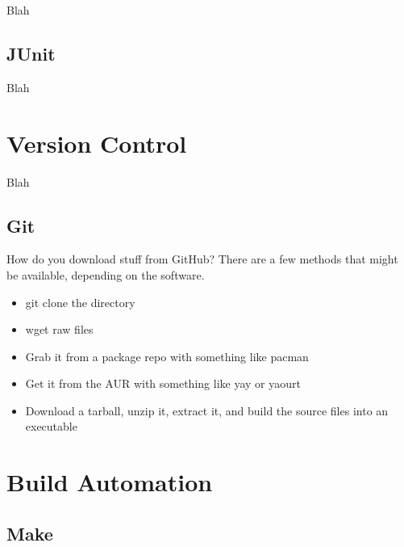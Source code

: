 Blah


\subsection{JUnit}

Blah


\toclineskip
\section{Version Control}

Blah


\subsection{Git}

How do you download stuff from GitHub? There are a few methods that might be available, depending on the software.
\begin{itemize}
	\item git clone the directory
	\item wget raw files
	\item Grab it from a package repo with something like pacman
	\item Get it from the AUR with something like yay or yaourt
	\item Download a tarball, unzip it, extract it, and build the source files into an executable
\end{itemize}


\toclineskip
\section{Build Automation}


\subsection{Make}

